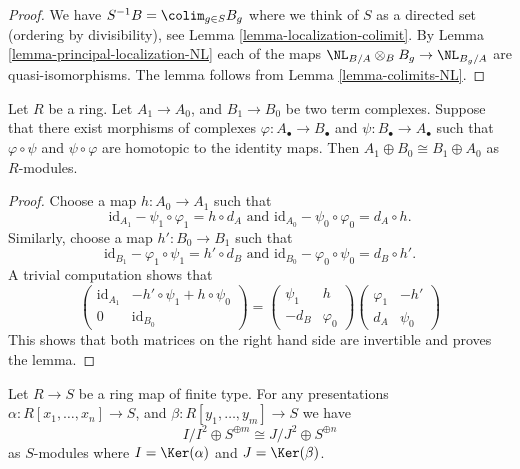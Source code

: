 \begin{proof}
We have $S^{-1}B = \colim_{g \in S} B_g$ where we think of $S$
as a directed set (ordering by divisibility), see
Lemma \ref{lemma-localization-colimit}.
By Lemma \ref{lemma-principal-localization-NL} each of the maps
$\NL_{B/A} \otimes_B B_g \to \NL_{B_g/A}$
are quasi-isomorphisms.
The lemma follows from Lemma \ref{lemma-colimits-NL}.
\end{proof}

\begin{lemma}
\label{lemma-sum-two-terms}
Let $R$ be a ring.
Let $A_1 \to A_0$, and $B_1 \to B_0$ be
two term complexes. Suppose that there exist
morphisms of complexes $\varphi : A_\bullet \to B_\bullet$
and $\psi : B_\bullet \to A_\bullet$ such that
$\varphi \circ \psi$ and $\psi \circ \varphi$ are
homotopic to the identity maps.
Then $A_1 \oplus B_0 \cong B_1 \oplus A_0$ as
$R$-modules.
\end{lemma}

\begin{proof}
Choose a map $h : A_0 \to A_1$ such that
$$
\text{id}_{A_1} - \psi_1 \circ \varphi_1 = h \circ d_A
\text{ and }
\text{id}_{A_0} - \psi_0 \circ \varphi_0 = d_A \circ h.
$$
Similarly, choose a map $h' : B_0 \to B_1$ such that
$$
\text{id}_{B_1} - \varphi_1 \circ \psi_1 = h' \circ d_B
\text{ and }
\text{id}_{B_0} - \varphi_0 \circ \psi_0 = d_B \circ h'.
$$
A trivial computation shows that
$$
\left(
\begin{matrix}
\text{id}_{A_1} & -h' \circ \psi_1 + h \circ \psi_0 \\
0 & \text{id}_{B_0}
\end{matrix}
\right)
=
\left(
\begin{matrix}
\psi_1 & h \\
-d_B & \varphi_0
\end{matrix}
\right)
\left(
\begin{matrix}
\varphi_1 & - h' \\
d_A & \psi_0
\end{matrix}
\right)
$$
This shows that both matrices on the right hand side
are invertible and proves the lemma.
\end{proof}

\begin{lemma}
\label{lemma-conormal-module}
Let $R \to S$ be a ring map of finite type.
For any presentations $\alpha : R[x_1, \ldots, x_n] \to S$, and
$\beta : R[y_1, \ldots, y_m] \to S$ we have
$$
I/I^2 \oplus S^{\oplus m} \cong J/J^2 \oplus S^{\oplus n}
$$
as $S$-modules where $I = \Ker(\alpha)$ and $J = \Ker(\beta)$.
\end{lemma}

